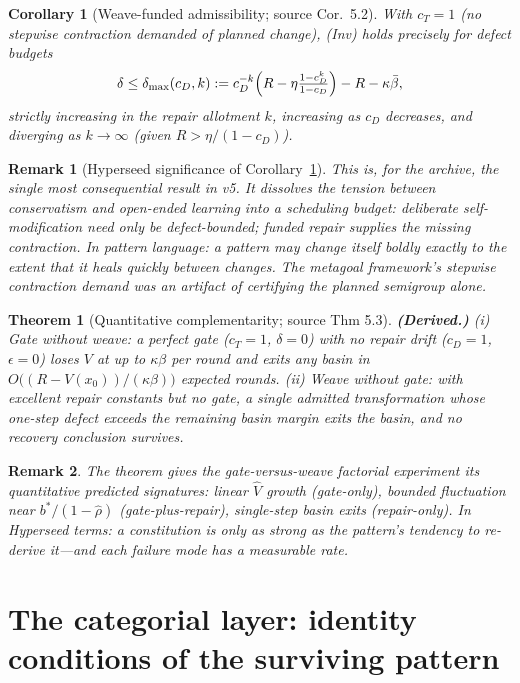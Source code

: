 \documentclass[11pt]{article}
\newtheorem{theorem}{Theorem}
\newtheorem{remark}{Remark}
\newtheorem{corollary}{Corollary}
\newcommand{\D}{D}
\begin{document}
\begin{corollary}[Weave-funded admissibility; source Cor.~5.2]\label{cor:weave}
With $c_T = 1$ (no stepwise contraction demanded of planned change), (Inv) holds
precisely for defect budgets
\[
\delta \le \delta_{\max}(c_{\D}, k) := c_{\D}^{-k}\Bigl( R - \eta\tfrac{1-c_{\D}^k}{1-c_{\D}} \Bigr) - R - \kappa\bar\beta,
\]
strictly increasing in the repair allotment $k$, increasing as $c_{\D}$ decreases, and
diverging as $k \to \infty$ (given $R > \eta/(1-c_{\D})$).
\end{corollary}

\begin{remark}[Hyperseed significance of Corollary~\ref{cor:weave}]
This is, for the archive, the single most consequential result in v5. It dissolves the
tension between conservatism and open-ended learning into a \emph{scheduling budget}:
deliberate self-modification need only be defect-bounded; funded repair supplies the
missing contraction. In pattern language: a pattern may change itself boldly exactly to
the extent that it heals quickly between changes. The metagoal framework's stepwise
contraction demand was an artifact of certifying the planned semigroup alone.
\end{remark}

\begin{theorem}[Quantitative complementarity; source Thm 5.3]\label{thm:comp}
\textbf{(Derived.)} (i) \emph{Gate without weave:} a perfect gate ($c_T=1$, $\delta=0$)
with no repair drift ($c_{\D}=1$, $\epsilon=0$) loses $V$ at up to $\kappa\beta$ per
round and exits any basin in $O\bigl((R - V(x_0))/(\kappa\beta)\bigr)$ expected rounds.
(ii) \emph{Weave without gate:} with excellent repair constants but no gate, a single
admitted transformation whose one-step defect exceeds the remaining basin margin exits
the basin, and no recovery conclusion survives.
\end{theorem}

\begin{remark}
The theorem gives the gate-versus-weave factorial experiment its quantitative predicted
signatures: linear $\hat V$ growth (gate-only), bounded fluctuation near
$b^{*}/(1-\hat\rho)$ (gate-plus-repair), single-step basin exits (repair-only). In
Hyperseed terms: \emph{a constitution is only as strong as the pattern's tendency to
re-derive it}---and each failure mode has a measurable rate.
\end{remark}

\section{The categorial layer: identity conditions of the surviving pattern}
\end{document}
